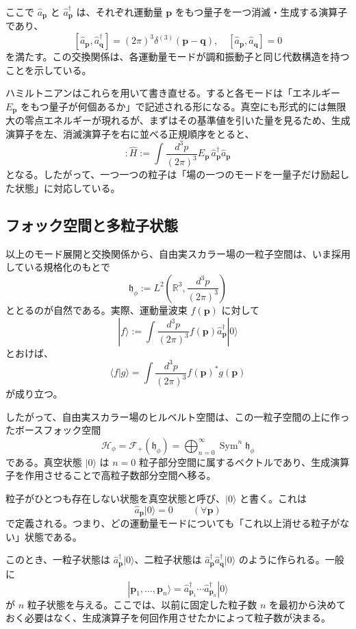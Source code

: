 ここで $\hat{a}_{\mathbf{p}}$ と $\hat{a}_{\mathbf{p}}^\dagger$ は、それぞれ運動量 $\mathbf{p}$ をもつ量子を一つ消滅・生成する演算子であり、
\[
[\hat{a}_{\mathbf{p}}, \hat{a}_{\mathbf{q}}^\dagger] = (2\pi)^3 \delta^{(3)}(\mathbf{p}-\mathbf{q}),
\quad
[\hat{a}_{\mathbf{p}}, \hat{a}_{\mathbf{q}}] = 0
\]
を満たす。この交換関係は、各運動量モードが調和振動子と同じ代数構造を持つことを示している。

ハミルトニアンはこれらを用いて書き直せる。すると各モードは「エネルギー $E_{\mathbf{p}}$ をもつ量子が何個あるか」で記述される形になる。真空にも形式的には無限大の零点エネルギーが現れるが、まずはその基準値を引いた量を見るため、生成演算子を左、消滅演算子を右に並べる正規順序をとると、
\[
:\hat{H}:=
\int \frac{d^3p}{(2\pi)^3} E_{\mathbf{p}} \,
\hat{a}_{\mathbf{p}}^\dagger \hat{a}_{\mathbf{p}}
\]
となる。したがって、一つ一つの粒子は「場の一つのモードを一量子だけ励起した状態」に対応している。

\subsection{フォック空間と多粒子状態}
以上のモード展開と交換関係から、自由実スカラー場の一粒子空間は、いま採用している規格化のもとで
\[
\mathfrak{h}_\phi
:=
L^2\!\left(\mathbb{R}^3,\frac{d^3p}{(2\pi)^3}\right)
\]
ととるのが自然である。実際、運動量波束 $f(\mathbf{p})$ に対して
\[
|f\rangle
:=
\int \frac{d^3p}{(2\pi)^3} f(\mathbf{p}) \hat{a}_{\mathbf{p}}^\dagger |0\rangle
\]
とおけば、
\[
\langle f|g\rangle
=
\int \frac{d^3p}{(2\pi)^3} f(\mathbf{p})^* g(\mathbf{p})
\]
が成り立つ。

したがって、自由実スカラー場のヒルベルト空間は、この一粒子空間の上に作ったボースフォック空間
\[
\mathcal{H}_\phi
=
\mathcal{F}_+(\mathfrak{h}_\phi)
=
\bigoplus_{n=0}^{\infty}\operatorname{Sym}^n \mathfrak{h}_\phi
\]
である。真空状態 $|0\rangle$ は $n=0$ 粒子部分空間に属するベクトルであり、生成演算子を作用させることで高粒子数部分空間へ移る。

粒子がひとつも存在しない状態を真空状態と呼び、$|0\rangle$ と書く。これは
\[
\hat{a}_{\mathbf{p}}|0\rangle = 0 \qquad (\forall \mathbf{p})
\]
で定義される。つまり、どの運動量モードについても「これ以上消せる粒子がない」状態である。

このとき、一粒子状態は $\hat{a}_{\mathbf{p}}^\dagger|0\rangle$、二粒子状態は $\hat{a}_{\mathbf{p}}^\dagger \hat{a}_{\mathbf{q}}^\dagger|0\rangle$ のように作られる。一般に
\[
|\mathbf{p}_1,\dots,\mathbf{p}_n\rangle
= \hat{a}_{\mathbf{p}_1}^\dagger \cdots \hat{a}_{\mathbf{p}_n}^\dagger |0\rangle
\]
が $n$ 粒子状態を与える。ここでは、以前に固定した粒子数 $n$ を最初から決めておく必要はなく、生成演算子を何回作用させたかによって粒子数が決まる。

